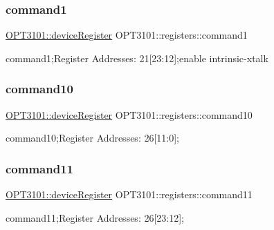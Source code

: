 \mbox{\label{class_o_p_t3101_1_1registers_ab467fd102aeb9c253099fcc2dadf1b50}} 
\subsubsection{\texorpdfstring{command1}{command1}}
{\footnotesize\ttfamily \mbox{\hyperlink{class_o_p_t3101_1_1device_register}{O\+P\+T3101\+::device\+Register}} O\+P\+T3101\+::registers\+::command1}



command1;Register Addresses\+: 21\mbox{[}23\+:12\mbox{]};enable intrinsic-\/xtalk 

\mbox{\label{class_o_p_t3101_1_1registers_a9bfb55fd85ac862b110a12f2f23eb699}} 
\subsubsection{\texorpdfstring{command10}{command10}}
{\footnotesize\ttfamily \mbox{\hyperlink{class_o_p_t3101_1_1device_register}{O\+P\+T3101\+::device\+Register}} O\+P\+T3101\+::registers\+::command10}



command10;Register Addresses\+: 26\mbox{[}11\+:0\mbox{]}; 

\mbox{\label{class_o_p_t3101_1_1registers_a680960aa51d5071409841500cf79fac7}} 
\subsubsection{\texorpdfstring{command11}{command11}}
{\footnotesize\ttfamily \mbox{\hyperlink{class_o_p_t3101_1_1device_register}{O\+P\+T3101\+::device\+Register}} O\+P\+T3101\+::registers\+::command11}



command11;Register Addresses\+: 26\mbox{[}23\+:12\mbox{]}; 


